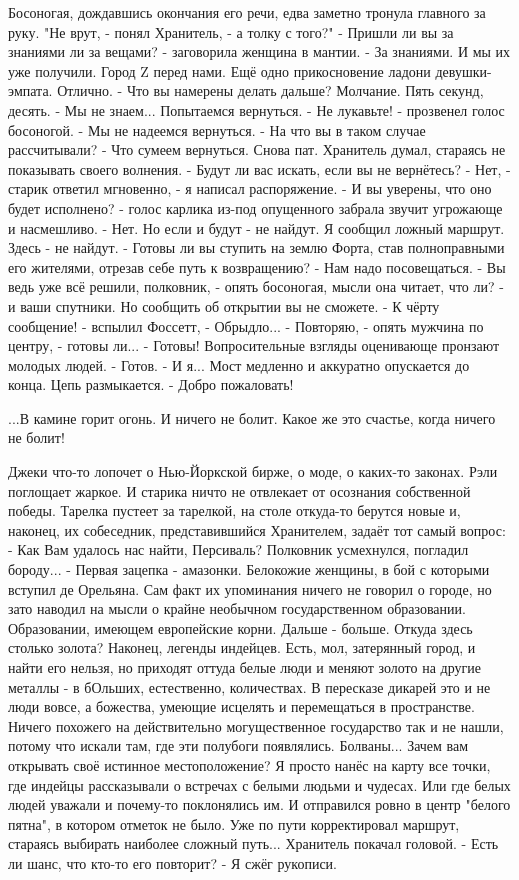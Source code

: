 Босоногая, дождавшись окончания его речи, едва заметно тронула главного за руку. "Не врут, - понял Хранитель, - а толку с того?"
- Пришли ли вы за знаниями ли за вещами? - заговорила женщина в мантии.
- За знаниями. И мы их уже получили. Город Z перед нами.
Ещё одно прикосновение ладони девушки-эмпата. Отлично.
- Что вы намерены делать дальше?
Молчание. Пять секунд, десять.
- Мы не знаем... Попытаемся вернуться.
- Не лукавьте! - прозвенел голос босоногой.
- Мы не надеемся вернуться.
- На что вы в таком случае рассчитывали?
- Что сумеем вернуться.
Снова пат. Хранитель думал, стараясь не показывать своего волнения.
- Будут ли вас искать, если вы не вернётесь?
- Нет, - старик ответил мгновенно, - я написал распоряжение.
- И вы уверены, что оно будет исполнено? - голос карлика из-под опущенного забрала звучит угрожающе и насмешливо.
- Нет. Но если и будут - не найдут. Я сообщил ложный маршрут. Здесь - не найдут.
- Готовы ли вы ступить на землю Форта, став полноправными его жителями, отрезав себе путь к возвращению?
- Нам надо посовещаться.
- Вы ведь уже всё решили, полковник, - опять босоногая, мысли она читает, что ли? - и ваши спутники. Но сообщить об открытии вы не сможете.
- К чёрту сообщение! - вспылил Фоссетт, - Обрыдло...
- Повторяю, - опять мужчина по центру, - готовы ли...
- Готовы!
Вопросительные взгляды оценивающе пронзают молодых людей.
- Готов.
- И я...
Мост медленно и аккуратно опускается до конца. Цепь размыкается.
- Добро пожаловать!


...В камине горит огонь. И ничего не болит. Какое же это счастье, когда ничего не болит!

Джеки что-то лопочет о Нью-Йоркской бирже, о моде, о каких-то законах. Рэли поглощает жаркое. И старика ничто не отвлекает от осознания собственной победы.
Тарелка пустеет за тарелкой, на столе откуда-то берутся новые и, наконец, их собеседник, представившийся Хранителем, задаёт тот самый вопрос:
- Как Вам удалось нас найти, Персиваль?
Полковник усмехнулся, погладил бороду...
- Первая зацепка - амазонки. Белокожие женщины, в бой с которыми вступил де Орельяна. Сам факт их упоминания ничего не говорил о городе, но зато наводил на мысли о крайне необычном государственном образовании. Образовании, имеющем европейские корни.
Дальше - больше. Откуда здесь столько золота?
Наконец, легенды индейцев. Есть, мол, затерянный город, и найти его нельзя, но приходят оттуда белые люди и меняют золото на другие металлы - в бОльших, естественно, количествах.
В пересказе дикарей это и не люди вовсе, а божества, умеющие исцелять и перемещаться в пространстве.
Ничего похожего на действительно могущественное государство так и не нашли, потому что искали там, где эти полубоги появлялись.
Болваны... Зачем вам открывать своё истинное местоположение? Я просто нанёс на карту все точки, где индейцы рассказывали о встречах с белыми людьми и чудесах. Или где белых людей уважали и почему-то поклонялись им. И отправился ровно в центр "белого пятна", в котором отметок не было.
Уже по пути корректировал маршрут, стараясь выбирать наиболее сложный путь...
Хранитель покачал головой.
- Есть ли шанс, что кто-то его повторит?
- Я сжёг рукописи.



